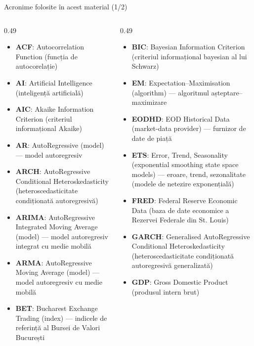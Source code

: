 {
\begin{frame}[noframenumbering]
    \titlepage
\end{frame}
}
\begin{frame}{Acronime folosite în acest material (1/2)}
\begin{columns}[T]
\begin{column}{0.49\textwidth}
\begin{itemize}\setlength{\itemsep}{0pt}
    \item \textbf{ACF}: Autocorrelation Function (funcția de autocorelație)
    \item \textbf{AI}: Artificial Intelligence (inteligență artificială)
    \item \textbf{AIC}: Akaike Information Criterion (criteriul informațional Akaike)
    \item \textbf{AR}: AutoRegressive (model) — model autoregresiv
    \item \textbf{ARCH}: AutoRegressive Conditional Heteroskedasticity (heteroscedasticitate condiționată autoregresivă)
    \item \textbf{ARIMA}: AutoRegressive Integrated Moving Average (model) — model autoregresiv integrat cu medie mobilă
    \item \textbf{ARMA}: AutoRegressive Moving Average (model) — model autoregresiv cu medie mobilă
    \item \textbf{BET}: Bucharest Exchange Trading (index) — indicele de referință al Bursei de Valori București
\end{itemize}
\end{column}
\begin{column}{0.49\textwidth}
\begin{itemize}\setlength{\itemsep}{0pt}
    \item \textbf{BIC}: Bayesian Information Criterion (criteriul informațional bayesian al lui Schwarz)
    \item \textbf{EM}: Expectation–Maximisation (algorithm) — algoritmul așteptare–maximizare
    \item \textbf{EODHD}: EOD Historical Data (market-data provider) — furnizor de date de piață
    \item \textbf{ETS}: Error, Trend, Seasonality (exponential smoothing state space models) — eroare, trend, sezonalitate (modele de netezire exponențială)
    \item \textbf{FRED}: Federal Reserve Economic Data (baza de date economice a Rezervei Federale din St. Louis)
    \item \textbf{GARCH}: Generalised AutoRegressive Conditional Heteroskedasticity (heteroscedasticitate condiționată autoregresivă generalizată)
    \item \textbf{GDP}: Gross Domestic Product (produsul intern brut)
\end{itemize}
\end{column}
\end{columns}
\end{frame}
